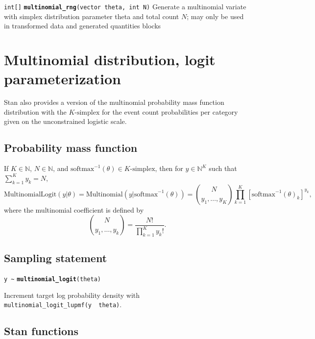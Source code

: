 \documentclass[
  10pt,
]{book}
\begin{document}

\texttt{int{[}{]}} \textbf{\texttt{multinomial\_rng}}\texttt{(vector\ theta,\ int\ N)}\newline
Generate a multinomial variate with simplex distribution parameter
theta and total count \(N\); may only be used in transformed data and
generated quantities blocks

\hypertarget{multinomial-distribution-logit-parameterization}{%
\section{Multinomial distribution, logit parameterization}\label{multinomial-distribution-logit-parameterization}}

Stan also provides a version of the multinomial probability mass
function distribution with the \(\text{$K$-simplex}\) for the event
count probabilities per category given on the unconstrained logistic
scale.

\hypertarget{probability-mass-function-17}{%
\subsection{Probability mass function}\label{probability-mass-function-17}}

If \(K \in \mathbb{N}\), \(N \in \mathbb{N}\), and \(\text{softmax}^{-1}(\theta) \in \text{$K$-simplex}\), then for \(y \in \mathbb{N}^K\) such that
\(\sum_{k=1}^K y_k = N\), \[
\text{MultinomialLogit}(y|\theta) = \text{Multinomial}(y|\text{softmax}^{-1}(\theta)) =
\binom{N}{y_1,\ldots,y_K} \prod_{k=1}^K [\text{softmax}^{-1}(\theta)_k]^{y_k}, \] where the
multinomial coefficient is defined by \[ \binom{N}{y_1,\ldots,y_k} =
\frac{N!}{\prod_{k=1}^K y_k!}. \]

\hypertarget{sampling-statement-21}{%
\subsection{Sampling statement}\label{sampling-statement-21}}

\texttt{y\ \textasciitilde{}} \textbf{\texttt{multinomial\_logit}}\texttt{(theta)}

Increment target log probability density with \texttt{multinomial\_logit\_lupmf(y\ \textbar{}\ theta)}.

\hypertarget{stan-functions-20}{%
\subsection{Stan functions}\label{stan-functions-20}}
\end{document}
